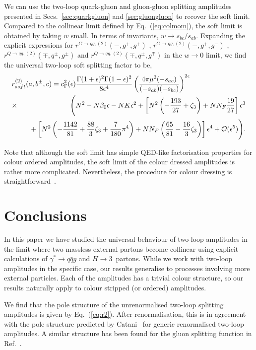 \documentclass[paper,notoc,nohyper]{JHEP3}
\def\e{\epsilon}
\def\sab{s_{ab}}
\def\sac{s_{ac}}
\def\sbc{s_{bc}}
\def\NF{N_F}
\def\e{\epsilon}
\begin{document}
We can use the two-loop quark-gluon and gluon-gluon splitting amplitudes presented in Secs.~\ref{sec:quarkgluon} and \ref{sec:gluongluon}
to recover the soft limit. Compared to the collinear limit defined by Eq.~(\ref{eq:colmom}), 
the soft limit is obtained by taking $w$ small. 
In terms of invariants, $w \to s_{bc}/s_{ab}$.  Expanding the explicit expressions for 
$r^{G\to gg,(2)}(-,g^+,g^+)$ , $r^{G\to gg,(2)}(-,g^+,g^-)$ , $r^{Q\to qg,(2)}(\mp,q^\pm,g^\pm)$ and 
$r^{Q\to qg,(2)}(\mp,q^\pm,g^\mp)$ in the $w \to 0$ limit, we find the universal two-loop soft splitting factor to be,
\begin{eqnarray}
\label{eq:r2soft}
\lefteqn{r^{(2)}_{soft}(a,b^\pm,c) 
=c_\Gamma^2(\e)\frac{\Gamma(1+\e)^2\Gamma(1-\e)^2}{8\e^4}   
\left( \frac{4\pi\mu^2 (-\sac)}{(-\sab)(-\sbc)} \right)^{2\e}} \nonumber \\
&\times& \Bigg( 
N^2-N\beta_0 \e -N K \e^2 +\left[N^2 \left(-\frac{193}{27}+\zeta_3\right) + N\NF \frac{19}{27}\right]\e^3 \nonumber \\
&&
\phantom{+}+\left[N^2 \left(-\frac{1142}{81}+\frac{88}{3}\zeta_3+\frac{7}{180}\pi^4\right) +
N\NF\left(\frac{65}{81}-\frac{16}{3}\zeta_3\right)\right]\e^4
+ {\cal O}(\e^5)\Bigg).
\end{eqnarray}


Note that although the soft limit has simple QED-like factorisation properties for
colour ordered amplitudes, the soft limit of the colour dressed amplitudes is rather more complicated.
Nevertheless, the procedure for colour dressing
is straightforward~\cite{Catani:2000pi,Bern:2lsplit}. 

\section{Conclusions}
\label{sec:conclusions}


In this paper we have studied the universal behaviour of two-loop amplitudes in
the limit where two massless external partons become collinear
using explicit calculations of $\gamma^* \to q \bar qg$ and $H \to 3$~partons.
While we work with  
two-loop amplitudes in the specific case, our
results generalise to processes involving more external  particles. Each of the
amplitudes has a trivial colour structure,  so our results
naturally apply to colour stripped (or ordered) amplitudes.

We find that the pole structure of the 
unrenormalised two-loop splitting amplitudes is given by
Eq.~(\ref{eq:r2}).   After renormalisation, this is in agreement with
the pole structure predicted by Catani~\cite{Catani:polestruc} for generic renormalised
two-loop amplitudes. A similar structure has been found for the gluon 
splitting function in Ref.~\cite{Bern:2lsplit}.
\end{document}
